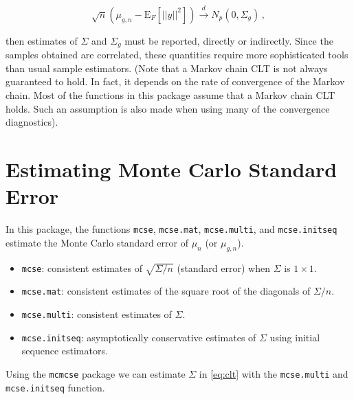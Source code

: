 \documentclass[11pt]{article}
\begin{document}
\begin{equation}
\label{eq:g_clt}
\sqrt{n}(\mu_{g,n} - \text{E}_F [||y||^2]) \overset{d}{\to} N_p(0, \Sigma_g)\,,
\end{equation}

then estimates of $\Sigma$ and $\Sigma_g$ must be reported, directly or indirectly. Since the samples obtained are correlated, these quantities require more sophisticated tools than usual sample estimators.
(Note that a Markov chain CLT is not always guaranteed to hold. In fact, it depends on the rate of convergence of the Markov chain. Most of the functions in this package assume that a Markov chain CLT holds. Such an assumption is also made when using many of the convergence diagnostics).

\bigskip

\section{Estimating Monte Carlo Standard Error}
In this package, the functions \texttt{mcse}, \texttt{mcse.mat}, \texttt{mcse.multi}, and \texttt{mcse.initseq} estimate the Monte Carlo standard error of $\mu_n$ (or $\mu_{g,n}$).
\begin{itemize}
\item \texttt{mcse}: consistent estimates of $\sqrt{\Sigma/n}$ (standard error) when $\Sigma$ is $1 \times 1$. 
\item \texttt{mcse.mat}: consistent estimates of the square root of the  diagonals of $\Sigma/n$.
\item \texttt{mcse.multi}: consistent estimates of $\Sigma$.
\item \texttt{mcse.initseq}: asymptotically conservative estimates of $\Sigma$ using initial sequence estimators.
\end{itemize}

Using the \texttt{mcmcse} package we can estimate $\Sigma$ in \eqref{eq:clt} with the \texttt{mcse.multi} and \texttt{mcse.initseq} function.
\end{document}
